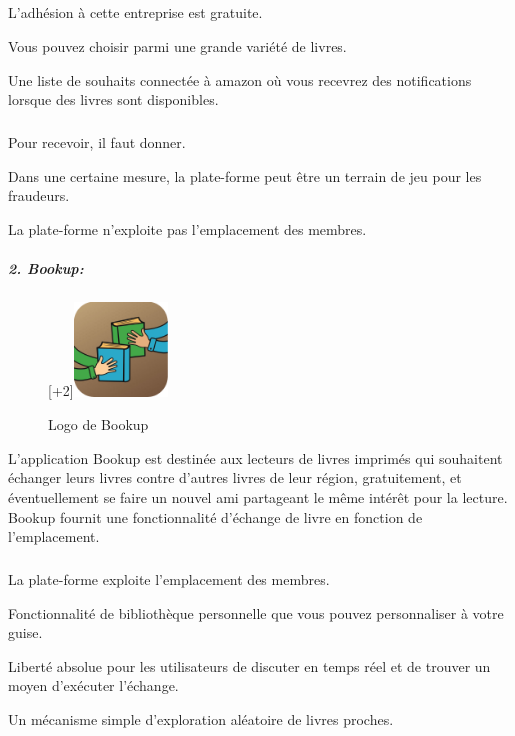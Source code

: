 \subparagraph*{}
\begin{list}{•}{\textbf{Avantages}}
	\item L'adhésion à cette entreprise est gratuite.
	\item Vous pouvez choisir parmi une grande variété de livres.
	\item Une liste de souhaits connectée à amazon où vous recevrez des notifications lorsque des livres sont disponibles.
\end{list}

\subparagraph*{}
\begin{list}{•}{\textbf{Inconvénients}}
	\item Pour recevoir, il faut donner.
	\item Dans une certaine mesure, la plate-forme peut être un terrain de jeu pour les fraudeurs.
	\item La plate-forme n'exploite pas l'emplacement des membres.
\end{list}

\subparagraph{{\large 2. Bookup:}\medskip \\}

\begin{figure}
		\raisebox{0pt}[\dimexpr\height+2\baselineskip\relax]{\includegraphics[width=2.5cm]{Images/chapter1/bookUpLogo.jpg}}
		\caption{{\footnotesize Logo de Bookup}}
\end{figure}

L'application Bookup est destinée aux lecteurs de livres imprimés qui souhaitent échanger leurs livres contre d'autres livres de leur région, gratuitement, et éventuellement se faire un nouvel ami partageant le même intérêt pour la lecture. Bookup fournit une fonctionnalité d’échange de livre en fonction de l’emplacement.\cite{noauthor_bookup_nodate-1}\\

\subparagraph*{}
\begin{list}{•}{\textbf{Avantages}}
	\item La plate-forme exploite l'emplacement des membres.
	\item Fonctionnalité de bibliothèque personnelle que vous pouvez personnaliser à votre guise.
	\item Liberté absolue pour les utilisateurs de discuter en temps réel et de trouver un moyen d'exécuter l'échange.
	\item Un mécanisme simple d'exploration aléatoire de livres proches.
\end{list}

